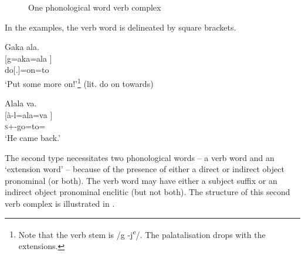 \begin{figure}
\caption{\label{fig:7.1}One phonological word verb complex}
\end{figure}
In the examples, the verb word is delineated by square brackets.

\ea\label{ex:7:1}
Gaka  ala.\\
\gll {}[g=aka=ala ]\\
do[{\twoS}.{\IMP}]=on=to\\
\glt ‘Put some more on!’\footnote{Note that the verb stem is /g -j\textsuperscript{e}/.  The palatalisation drops with the extensions.} (lit. do on towards)  
\z

\ea\label{ex:7:2}
Alala  va.\\
\gll  {}[à-l=ala=va ]\\
\textsc{s}+{\PFV}-go=to={\PRF}\\
\glt  ‘He came back.’ 
\z

The second type necessitates two phonological words -- a verb word and an ‘extension word’ – because of the presence of either a direct or indirect object pronominal (or both). The verb word may have either a subject suffix or an indirect object pronominal enclitic (but not both). The structure of this second verb complex is illustrated in .


